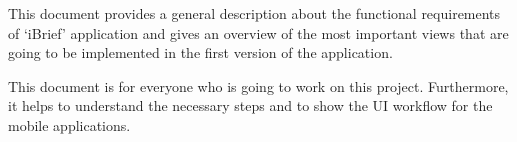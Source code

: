 This document provides a general description about the functional requirements of `iBrief' application and gives an overview of the most important views that are going to be implemented in the first version of the application.

This document is for everyone who is going to work on this project. Furthermore, it helps to understand the necessary steps and to show the \gls{UI} workflow for the mobile applications.



